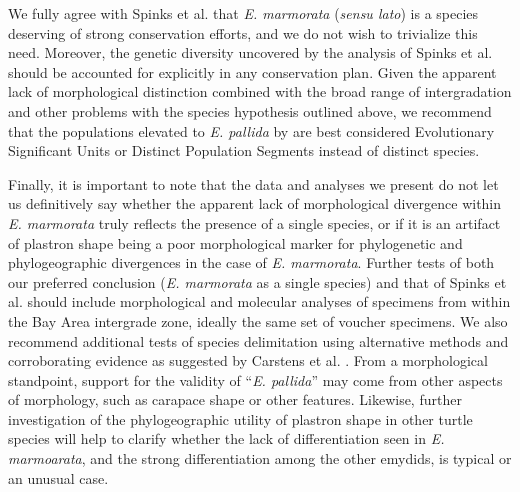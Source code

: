 \documentclass[10pt,letterpaper]{article}
\begin{document}
We fully agree with Spinks et al. \cite{Spinks2014} that \textit{E. marmorata} (\textit{sensu lato}) is a species deserving of strong conservation efforts, and we do not wish to trivialize this need. Moreover, the genetic diversity uncovered by the analysis of Spinks et al. \cite{Spinks2014} should be accounted for explicitly in any conservation plan. Given the apparent lack of morphological distinction combined with the broad range of intergradation and other problems with the species hypothesis outlined above, we recommend that the populations elevated to \textit{E. pallida} by \cite{Spinks2014} are best considered Evolutionary Significant Units or Distinct Population Segments instead of distinct species.

Finally, it is important to note that the data and analyses we present do not let us definitively say whether the apparent lack of morphological divergence within \textit{E. marmorata} truly reflects the presence of a single species, or if it is an artifact of plastron shape being a poor morphological marker for phylogenetic and phylogeographic divergences in the case of \textit{E. marmorata}. Further tests of both our preferred conclusion (\textit{E. marmorata} as a single species) and that of Spinks et al. \cite{Spinks2014} should include morphological and molecular analyses of specimens from within the Bay Area intergrade zone, ideally the same set of voucher specimens. We also recommend additional tests of species delimitation using alternative methods and corroborating evidence as suggested by Carstens et al. \cite{Carstens2013}. From a morphological standpoint, support for the validity of ``\textit{E. pallida}'' may come from other aspects of morphology, such as carapace shape or other features. Likewise, further investigation of the phylogeographic utility of plastron shape in other turtle species will help to clarify whether the lack of differentiation seen in \textit{E. marmoarata}, and the strong differentiation among the other emydids, is typical or an unusual case.


%
\end{document}
